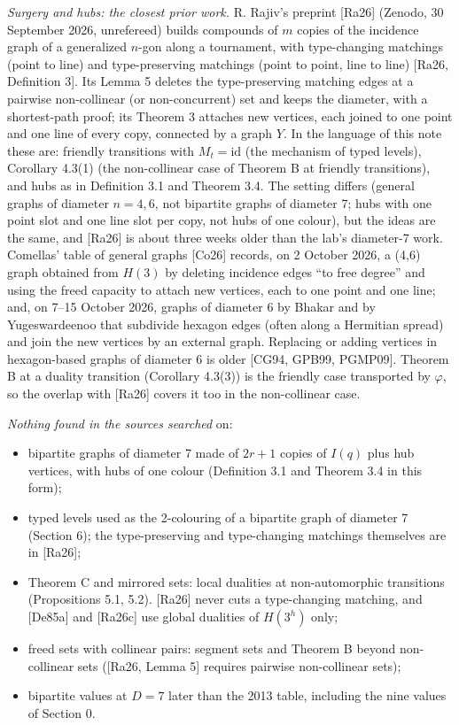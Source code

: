 \documentclass[
  11pt,
]{article}
\providecommand{\tightlist}{%
  \setlength{\itemsep}{0pt}\setlength{\parskip}{0pt}}
\begin{document}
\emph{Surgery and hubs: the closest prior work.} R. Rajiv's preprint {[}Ra26{]} (Zenodo, 30 September 2026, unrefereed)
builds compounds of \(m\) copies of the incidence graph of a generalized \(n\)-gon along a tournament, with
type-changing matchings (point to line) and type-preserving matchings (point to point, line to line) {[}Ra26, Definition
3{]}. Its Lemma 5 deletes the type-preserving matching edges at a pairwise non-collinear (or non-concurrent) set and
keeps the diameter, with a shortest-path proof; its Theorem 3 attaches new vertices, each joined to one point and one
line of every copy, connected by a graph \(Y\). In the language of this note these are: friendly transitions with
\(M_t = \mathrm{id}\) (the mechanism of typed levels), Corollary 4.3(1) (the non-collinear case of Theorem B at friendly
transitions), and hubs as in Definition 3.1 and Theorem 3.4. The setting differs (general graphs of diameter
\(n = 4, 6\), not bipartite graphs of diameter 7; hubs with one point slot and one line slot per copy, not hubs of one
colour), but the ideas are the same, and {[}Ra26{]} is about three weeks older than the lab's diameter-7 work. Comellas'
table of general graphs {[}Co26{]} records, on 2 October 2026, a (4,6) graph obtained from \(H(3)\) by deleting
incidence edges ``to free degree'' and using the freed capacity to attach new vertices, each to one point and one line;
and, on 7--15 October 2026, graphs of diameter 6 by Bhakar and by Yugeswardeenoo that subdivide hexagon edges (often
along a Hermitian spread) and join the new vertices by an external graph. Replacing or adding vertices in hexagon-based
graphs of diameter 6 is older {[}CG94, GPB99, PGMP09{]}. Theorem B at a duality transition (Corollary 4.3(3)) is the
friendly case transported by \(\varphi\), so the overlap with {[}Ra26{]} covers it too in the non-collinear case.

\emph{Nothing found in the sources searched} on:

\begin{itemize}
\tightlist
\item
  bipartite graphs of diameter 7 made of \(2r+1\) copies of \(I(q)\) plus hub vertices, with hubs of one colour
  (Definition 3.1 and Theorem 3.4 in this form);
\item
  typed levels used as the 2-colouring of a bipartite graph of diameter 7 (Section 6); the type-preserving and
  type-changing matchings themselves are in {[}Ra26{]};
\item
  Theorem C and mirrored sets: local dualities at non-automorphic transitions (Propositions 5.1, 5.2). {[}Ra26{]} never
  cuts a type-changing matching, and {[}De85a{]} and {[}Ra26c{]} use global dualities of \(H(3^h)\) only;
\item
  freed sets with collinear pairs: segment sets and Theorem B beyond non-collinear sets ({[}Ra26, Lemma 5{]} requires
  pairwise non-collinear sets);
\item
  bipartite values at \(D = 7\) later than the 2013 table, including the nine values of Section 0.
\end{itemize}
\end{document}
